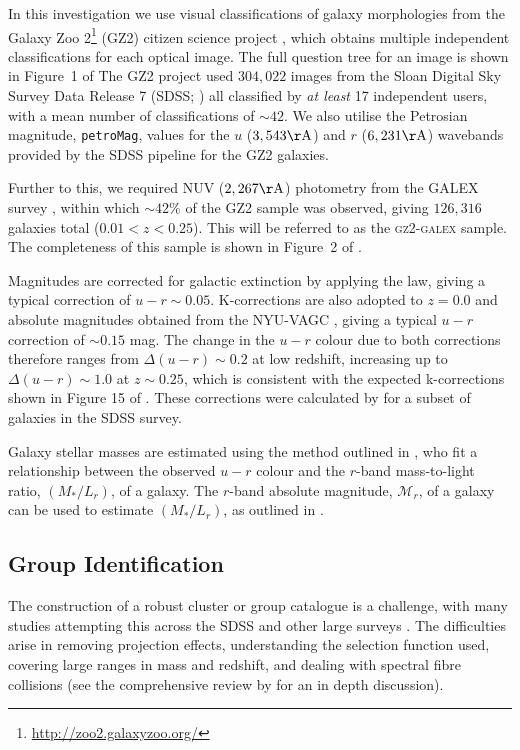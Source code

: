 \documentclass[useAMS,usenatbib]{mn2e}
\begin{document}
In this investigation we use visual classifications of galaxy morphologies from the Galaxy Zoo 2\footnote{\url{http://zoo2.galaxyzoo.org/}} (GZ2) citizen science project \citep{lintott09, GZ2}, which obtains multiple independent classifications for each optical image. The full question tree for an image is shown in Figure~1 of \citeauthor{GZ2}  The GZ2 project used $304, 022$ images from the Sloan Digital Sky Survey Data Release 7 (SDSS; \citealt{york00, abazajian09}) all classified by \emph{at least} 17 independent users, with a mean number of classifications of $\sim42$. We also utilise the Petrosian magnitude, {\tt petroMag}, values for the $u$ ($3,543 \rm{\AA}$) and $r$ ($6,231 \rm{\AA}$) wavebands provided by the SDSS pipeline for the GZ2 galaxies.

Further to this, we required NUV ($2,267 \rm{\AA}$) photometry from the GALEX survey \citep{martin05}, within which $\sim42\%$ of the GZ2 sample was observed, giving $126, 316$ galaxies total ($0.01 < z < 0.25$). This will be referred to as the \textsc{gz2-galex} sample. The completeness of this sample is shown in Figure~2 of \cite{smethurst15}. 

Magnitudes are corrected for galactic extinction \citep{Oh11} by applying the \citet{Cardelli89} law, giving a typical correction of $u-r \sim 0.05$. K-corrections are also adopted to $z=0.0$ and absolute magnitudes obtained from the NYU-VAGC \citep{Blanton05, padmanabhan08, blanton07}, giving a typical $u-r$ correction of $\sim 0.15$ mag. The change in the $u-r$ colour due to both corrections therefore ranges from $\Delta (u-r) \sim 0.2$ at low redshift, increasing up to $\Delta (u-r) \sim 1.0$ at $z \sim 0.25$, which is consistent with the expected k-corrections shown in Figure 15 of \citet{blanton07}. These corrections were calculated by \citet{Bamford09} for a subset of galaxies in the SDSS survey.

Galaxy stellar masses are estimated using the method outlined in \cite{Baldry06}, who fit a relationship between the observed $u-r$ colour and the $r$-band mass-to-light ratio, $(M_*/L_r)$, of a galaxy. The $r$-band absolute magnitude, $\mathcal{M}_r$, of a galaxy can be used to estimate $(M_*/L_r)$, as outlined in \cite{blanton01}. 


\subsection{Group Identification}\label{sec:groups}


The construction of a robust cluster or group catalogue is a challenge, with many studies attempting this across the SDSS \citep{merchan05, miller05, berlind06, yang07, tago08, tago10, tinker11, munoz12, tempel14} and other large surveys \citep{tucker00, merchan02, eke04, cucciati10, robotham11, knobel12}. The difficulties arise in removing projection effects, understanding the selection function used, covering large ranges in mass and redshift, and dealing with spectral fibre collisions (see the comprehensive review by \citealt{postman02} for an in depth discussion). 
\end{document}
